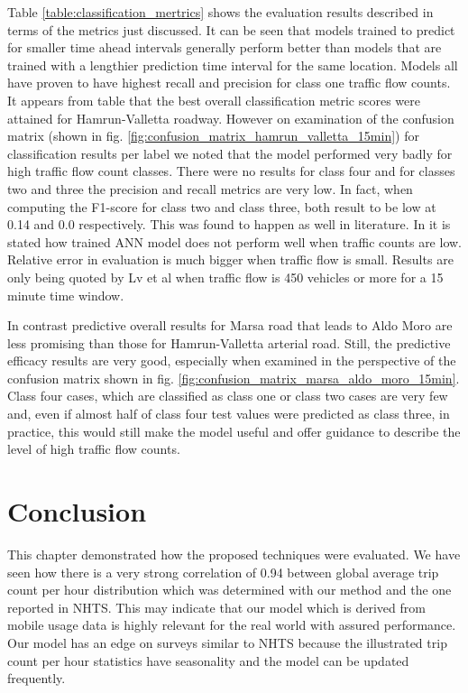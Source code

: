 \documentclass[12pt, a4paper]{report}
\theoremstyle{definition}
\theoremstyle{definition}%
\theoremstyle{definition}%
\theoremstyle{definition}%
\theoremstyle{definition}%
\theoremstyle{definition}%
\begin{document}
Table \ref{table:classification_mertrics} shows the evaluation results described in terms of the metrics just discussed. It can be seen that models trained to predict for smaller time ahead intervals generally perform better than models that are trained with a lengthier prediction time interval for the same location.  Models all have proven to have highest recall and precision for class one traffic flow counts. It appears from table that the best overall classification metric scores were attained for Hamrun-Valletta roadway. However on examination of the confusion matrix (shown in fig. \ref{fig:confusion_matrix_hamrun_valletta_15min}) for classification results per label we noted that the model performed very badly for high traffic flow count classes. There were no results for class four and for classes two and three the precision and recall metrics are very low. In fact, when computing the F1-score for class two and class three, both result to be low at 0.14 and 0.0 respectively. This was found to happen as well in literature. In \cite{lv2015traffic} it is stated how trained ANN model does not perform well when traffic counts are low. Relative error in evaluation is much bigger when traffic flow is small. Results are only being quoted by Lv et al when traffic flow is 450 vehicles or more for a 15 minute time window.

In contrast predictive overall results for Marsa road that leads to Aldo Moro are less promising than those for Hamrun-Valletta arterial road. Still, the predictive efficacy results are very good, especially when examined in the perspective of the confusion matrix shown in fig. \ref{fig:confusion_matrix_marsa_aldo_moro_15min}. Class four cases, which are classified as class one or class two cases are very few and, even if almost half of class four test values were predicted as class three, in practice, this would still make the model useful and offer guidance to describe the level of high traffic flow counts.


\section{Conclusion}

This chapter demonstrated how the proposed techniques were evaluated. We have seen how there is a very strong correlation of 0.94 between global average trip count per hour  distribution which was determined with our method and the one reported in NHTS. This may indicate that our model which is derived from mobile usage data is highly relevant for the real world with assured performance. Our model has an edge on surveys similar to NHTS because the illustrated trip count per hour statistics have seasonality and the model can be updated frequently.  
\end{document}
